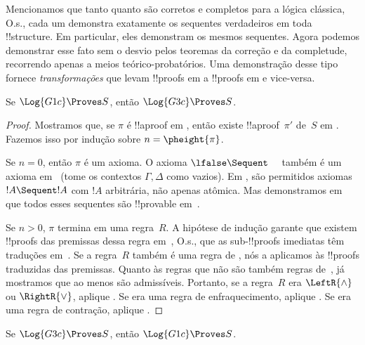 \documentclass[../../../include/open-logic-section]{subfiles}
\begin{document}


Mencionamos que tanto  quanto  são corretos e
completos para a lógica clássica, O.s.\@, cada um demonstra exatamente
os sequentes verdadeiros em toda !!{structure}. Em particular, eles
demonstram os mesmos sequentes. Agora podemos demonstrar esse fato sem o
desvio pelos teoremas da correção e da completude, recorrendo apenas a
meios teórico-probatórios. Uma demonstração desse tipo fornece
\emph{transformações} que levam !!{proof}s em  a !!{proof}s em
 e vice-versa.

\begin{prop}
Se $\Log{G1c} \Proves S$, então $\Log{G3c} \Proves S$.
\end{prop}

\begin{proof}
  Mostramos que, se $\pi$ é !!a{proof} em , então existe
  !!a{proof}~$\pi'$ de~$S$ em . Fazemos isso por indução sobre
  $n = \pheight{\pi}$.

  Se $n = 0$, então $\pi$ é um axioma. O axioma $\lfalse \Sequent
  \quad$ também é um axioma em~ (tome os contextos $\Gamma,
  \Delta$ como vazios). Em , são permitidos axiomas
  $!A \Sequent !A$ com $!A$ arbitrária, não apenas atômica. Mas
  demonstramos em  que todos esses sequentes
  são !!{provable} em~.
  
  Se $n>0$, $\pi$ termina em uma regra~$R$. A hipótese de indução
  garante que existem !!{proof}s das premissas dessa regra em~,
  O.s.\@, que as sub-!!{proof}s imediatas têm traduções em~. Se
  a regra~$R$ também é uma regra de , nós a aplicamos às
  !!{proof}s traduzidas das premissas. Quanto às regras que não são
  também regras de~, já mostramos que ao menos são admissíveis.
  Portanto, se a regra~$R$ era $\LeftR{\land}$ ou $\RightR{\lor}$,
  aplique . Se era uma regra de
  enfraquecimento, aplique . Se era uma
  regra de contração, aplique .
\end{proof}

\begin{prop}
Se $\Log{G3c} \Proves S$, então $\Log{G1c} \Proves S$.
\end{prop}
\end{document}
